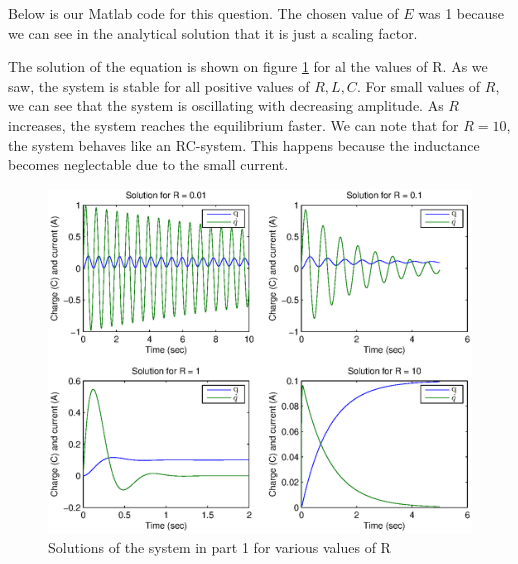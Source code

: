 Below is our Matlab code for this question. The chosen value of $E$ was 1 because we can see in the analytical solution that it is just a scaling factor.


The solution of the equation is shown on figure \ref{result1} for al the values of R. As we saw, the system is stable for all positive values of $R,L,C$. For small values of $R$, we can see that the system is oscillating with decreasing amplitude. As $R$ increases, the system reaches the equilibrium faster. We can note that for $R=10$, the system behaves like an RC-system. This happens because the inductance becomes neglectable due to the small current.

\begin{figure}
\begin{center}
\includegraphics[scale=0.5]{result1.eps}
\caption{Solutions of the system in part 1 for various values of R}
\label{result1}
\end{center}
\end{figure}
 
\FloatBarrier 
 
